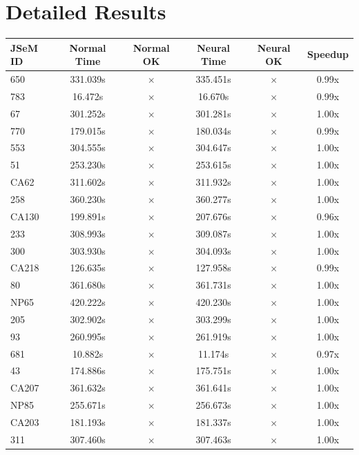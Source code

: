 \documentclass[a4paper,10pt]{article}
\begin{document}
\section{Detailed Results}
\begin{longtable}{lccccc}
\toprule
\textbf{JSeM ID} & \textbf{Normal Time} & \textbf{Normal OK} & \textbf{Neural Time} & \textbf{Neural OK} & \textbf{Speedup} \\
\midrule
\endhead
650 & 331.039s & $\times$ & 335.451s & $\times$ & 0.99x \\
783 & 16.472s & $\times$ & 16.670s & $\times$ & 0.99x \\
67 & 301.252s & $\times$ & 301.281s & $\times$ & 1.00x \\
770 & 179.015s & $\times$ & 180.034s & $\times$ & 0.99x \\
553 & 304.555s & $\times$ & 304.647s & $\times$ & 1.00x \\
51 & 253.230s & $\times$ & 253.615s & $\times$ & 1.00x \\
CA62 & 311.602s & $\times$ & 311.932s & $\times$ & 1.00x \\
258 & 360.230s & $\times$ & 360.277s & $\times$ & 1.00x \\
CA130 & 199.891s & $\times$ & 207.676s & $\times$ & 0.96x \\
233 & 308.993s & $\times$ & 309.087s & $\times$ & 1.00x \\
300 & 303.930s & $\times$ & 304.093s & $\times$ & 1.00x \\
CA218 & 126.635s & $\times$ & 127.958s & $\times$ & 0.99x \\
80 & 361.680s & $\times$ & 361.731s & $\times$ & 1.00x \\
NP65 & 420.222s & $\times$ & 420.230s & $\times$ & 1.00x \\
205 & 302.902s & $\times$ & 303.299s & $\times$ & 1.00x \\
93 & 260.995s & $\times$ & 261.919s & $\times$ & 1.00x \\
681 & 10.882s & $\times$ & 11.174s & $\times$ & 0.97x \\
43 & 174.886s & $\times$ & 175.751s & $\times$ & 1.00x \\
CA207 & 361.632s & $\times$ & 361.641s & $\times$ & 1.00x \\
NP85 & 255.671s & $\times$ & 256.673s & $\times$ & 1.00x \\
CA203 & 181.193s & $\times$ & 181.337s & $\times$ & 1.00x \\
311 & 307.460s & $\times$ & 307.463s & $\times$ & 1.00x \\

\end{longtable}
\end{document}
